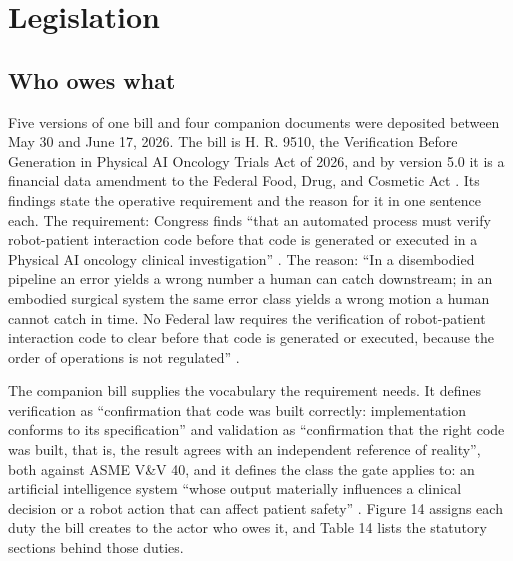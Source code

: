 \section{Legislation}
\label{sec:legislation}

\subsection{Who owes what}

Five versions of one bill and four companion documents were deposited between
May 30 and June 17, 2026. The bill is H. R. 9510, the Verification Before
Generation in Physical AI Oncology Trials Act of 2026, and by version 5.0 it is
a financial data amendment to the Federal Food, Drug, and Cosmetic Act
\cite{hr9510billv5}. Its findings state the operative requirement and the reason
for it in one sentence each. The requirement: Congress finds ``that an automated
process must verify robot-patient interaction code before that code is generated
or executed in a Physical AI oncology clinical investigation'' \cite{hr9510billv5}.
The reason: ``In a disembodied pipeline an error yields a wrong number a human
can catch downstream; in an embodied surgical system the same error class yields
a wrong motion a human cannot catch in time. No Federal law requires the
verification of robot-patient interaction code to clear before that code is
generated or executed, because the order of operations is not regulated''
\cite{hr9510billv5, verifygenact}.

The companion bill supplies the vocabulary the requirement needs. It defines
verification as ``confirmation that code was built correctly: implementation
conforms to its specification'' and validation as ``confirmation that the right
code was built, that is, the result agrees with an independent reference of
reality'', both against ASME V\&V 40, and it defines the class the gate applies
to: an artificial intelligence system ``whose output materially influences a
clinical decision or a robot action that can affect patient safety''
\cite{vvuqbill2026, asmevv40}. Figure 14 assigns each duty the bill creates to
the actor who owes it, and Table 14 lists the statutory sections behind those
duties.


